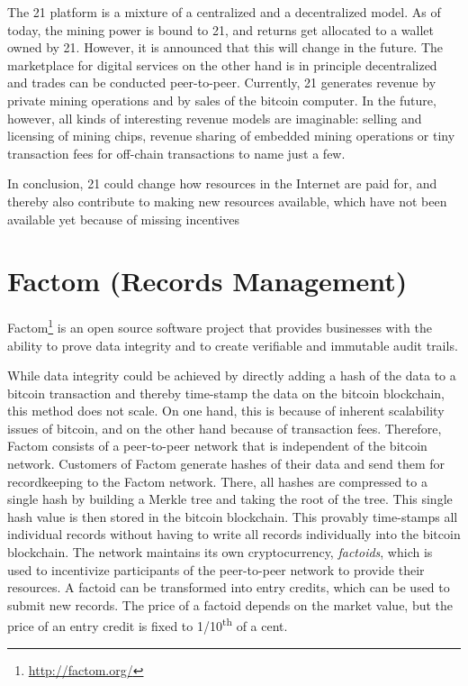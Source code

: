 The 21 platform is a mixture of a centralized and a decentralized model. As of 
today, the mining power is bound to 21, and returns get allocated to a wallet owned 
by 21. However, it is announced that this will change in the future. The marketplace 
for digital services on the other hand is in principle decentralized and trades 
can be conducted peer-to-peer. Currently, 21 generates revenue by private mining 
operations and by sales of the bitcoin computer. In the future, however, all kinds 
of interesting revenue models are imaginable: selling and licensing of mining chips, 
revenue sharing of embedded mining operations or tiny transaction fees for off-chain 
transactions to name just a few. 

In conclusion, 21 could change how resources in the Internet are paid for, and 
thereby also contribute to making new resources available, which have not been 
available yet because of missing incentives

\section{Factom (Records Management)}
\label{sec:ecofactom}

Factom\footnote{\url{http://factom.org/}} is an open source software project that provides businesses with 
the ability to prove data integrity and to create verifiable and immutable audit 
trails. 

While data integrity could be achieved by directly adding a hash of the data to 
a bitcoin transaction and thereby time-stamp the data on the bitcoin blockchain, 
this method does not scale. On one hand, this is because of inherent scalability 
issues of bitcoin, and on the other hand because of transaction fees. Therefore, 
Factom consists of a peer-to-peer network that is independent of the bitcoin network. 
Customers of Factom generate hashes of their data and send them for recordkeeping 
to the Factom network. There, all hashes are compressed to a single hash by building 
a Merkle tree and taking the root of the tree. This single hash 
value is then stored in the bitcoin blockchain. This provably time-stamps all individual 
records without having to write all records individually into the bitcoin blockchain. 
The network maintains its own cryptocurrency, \emph{factoids}, which is used to incentivize 
participants of the peer-to-peer network to provide their resources. A factoid 
can be transformed into entry credits, which can be used to submit new records. 
The price of a factoid depends on the market value, but the price of an entry credit 
is fixed to 1/10\textsuperscript{th} of a cent. 


